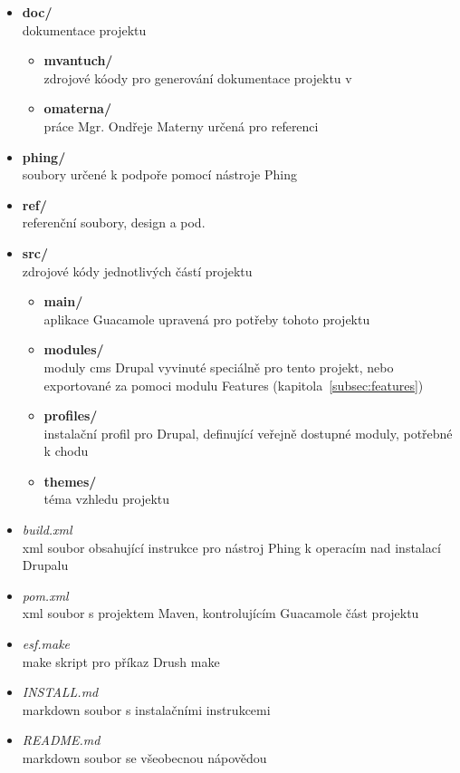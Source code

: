 \begin{itemize}
  \item \textbf{doc/} \hfill \\
    dokumentace projektu
  \begin{itemize}
    \item \textbf{mvantuch/} \hfill \\
      zdrojové kóody pro generování dokumentace projektu v 
    \item \textbf{omaterna/} \hfill \\
      práce Mgr. Ondřeje Materny určená pro referenci
  \end{itemize}
  \item \textbf{phing/} \hfill \\
    soubory určené k podpoře %
    pomocí nástroje Phing
  \item \textbf{ref/} \hfill \\
    referenční soubory, design a pod.
  \item \textbf{src/} \hfill \\
    zdrojové kódy jednotlivých částí projektu
    \begin{itemize}
      \item \textbf{main/} \hfill \\
        aplikace Guacamole upravená pro potřeby tohoto projektu
      \item \textbf{modules/} \hfill \\
        moduly \gls{cms} Drupal vyvinuté speciálně pro tento projekt, nebo exportované za pomoci modulu Features (kapitola~\ref{subsec:features})
      \item \textbf{profiles/} \hfill \\
        instalační profil pro Drupal, definující veřejně dostupné moduly, potřebné k chodu
      \item \textbf{themes/} \hfill \\
       téma vzhledu projektu
    \end{itemize}
  \item \emph{build.xml} \hfill \\
    xml soubor obsahující instrukce pro nástroj Phing k operacím nad instalací Drupalu
  \item \emph{pom.xml} \hfill \\
    xml soubor s projektem Maven, kontrolujícím Guacamole část projektu
  \item \emph{esf.make} \hfill \\
    make skript pro příkaz Drush make
  \item \emph{INSTALL.md} \hfill \\
    markdown soubor s instalačními instrukcemi
  \item \emph{README.md} \hfill \\
    markdown soubor se všeobecnou nápovědou
\end{itemize}
